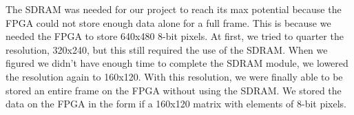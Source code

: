 The SDRAM was needed for our project to reach its max potential because the FPGA
could not store enough data alone for a full frame. This is because we needed 
the FPGA to store 640x480 8-bit pixels. At first, we tried to quarter the 
resolution, 320x240, but this still required the use of the SDRAM. When we 
figured we didn’t have enough time to complete the SDRAM module, we lowered the 
resolution again to 160x120. With this resolution, we were finally able to be 
stored an entire frame on the FPGA without using the SDRAM. We stored the data 
on the FPGA in the form if a 160x120 matrix with elements of 8-bit pixels.


